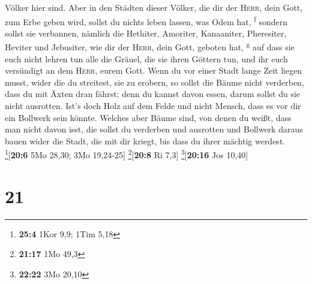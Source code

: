 Völker hier sind.  Aber in den Städten dieser Völker, die
dir der \textsc{Herr}, dein Gott, zum Erbe geben wird, sollst du nichts
leben lassen, was Odem hat, \textsuperscript{f}  sondern
sollst sie verbannen, nämlich die Hethiter, Amoriter, Kanaaniter,
Pheresiter, Heviter und Jebusiter, wie dir der \textsc{Herr}, dein Gott,
geboten hat, \textsuperscript{g}  auf dass sie euch nicht
lehren tun alle die Gräuel, die sie ihren Göttern tun, und ihr euch
versündigt an dem \textsc{Herr}, eurem Gott.  Wenn du vor
einer Stadt lange Zeit liegen musst, wider die du streitest, sie zu
erobern, so sollst die Bäume nicht verderben, dass du mit Äxten dran
fährst; denn du kannst davon essen, darum sollst du sie nicht ausrotten.
Ist's doch Holz auf dem Felde und nicht Mensch, dass es vor dir ein
Bollwerk sein könnte.  Welches aber Bäume sind, von denen
du weißt, dass man nicht davon isst, die sollst du verderben und
ausrotten und Bollwerk daraus bauen wider die Stadt, die mit dir kriegt,
bis dass du ihrer mächtig werdest. \footnote{\textbf{25:4} 1Kor 9,9;
  1Tim 5,18}{[}\textbf{20:6} 5Mo 28,30; 3Mo 19,24-25{]}
\footnote{\textbf{21:17} 1Mo 49,3}{[}\textbf{20:8} Ri 7,3{]}
\footnote{\textbf{22:22} 3Mo 20,10}{[}\textbf{20:16} Jos 10,40{]}

\hypertarget{section-20}{%
\section{21}\label{section-20}}

